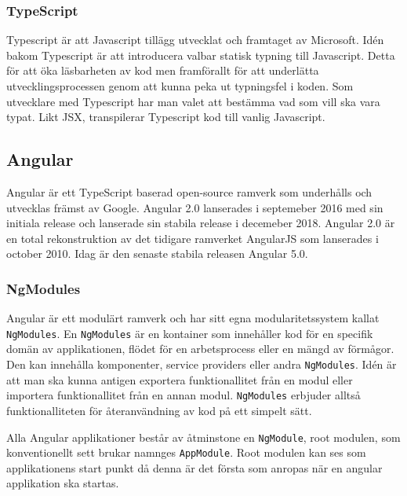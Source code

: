 
\subsubsection{TypeScript}
Typescript är att Javascript tillägg utvecklat och framtaget av Microsoft. Idén bakom Typescript är att introducera valbar statisk typning till Javascript. \cite{typescript} Detta för att öka läsbarheten av kod men framförallt för att underlätta utvecklingsprocessen genom att kunna peka ut typningsfel i koden. Som utvecklare med Typescript har man valet att bestämma vad som vill ska vara typat. Likt JSX, transpilerar Typescript kod till vanlig Javascript. \cite{typescript-book}


\subsection{Angular}
Angular är ett TypeScript baserad open-source ramverk som underhålls och utvecklas främst av Google. Angular 2.0 lanserades i septemeber 2016 med sin initiala release och lanserade sin stabila release i decemeber 2018. Angular 2.0 är en total rekonstruktion av det tidigare ramverket AngularJS som lanserades i october 2010. Idag är den senaste stabila releasen Angular 5.0. \cite{angular-date}

\subsubsection{NgModules}
Angular är ett modulärt ramverk och har sitt egna modularitetssystem kallat \texttt{NgModules}.\cite{angular-architecture} En \texttt{NgModules} är en kontainer som innehåller kod för en specifik domän av applikationen, flödet för en arbetsprocess eller en mängd av förmågor. Den kan innehålla komponenter, service providers eller andra \texttt{NgModules}. Idén är att man ska kunna antigen exportera funktionallitet från en modul eller importera funktionallitet från en annan modul. \texttt{NgModules} erbjuder alltså funktionalliteten för återanvändning av kod på ett simpelt sätt. 

Alla Angular applikationer består av åtminstone en \texttt{NgModule}, root modulen, som konventionellt sett brukar namnges \texttt{AppModule}.\cite{angular-modules} Root modulen kan ses som applikationens start punkt då denna är det första som anropas när en angular applikation ska startas.

